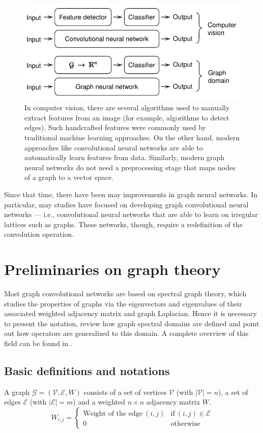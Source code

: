     \begin{figure}
        \centering
        \includegraphics[width=\textwidth]{images/comparison_nn_gnn.pdf}
        \caption{In computer vision, there are several algorithms used to manually extract features from an image (for example, algorithms to detect edges). Such handcrafted features were commonly used by traditional machine learning approaches. On the other hand, modern approaches like convolutional neural networks are able to automatically learn features from data. Similarly, modern graph neural networks do not need a preprocessing stage that maps nodes of a graph to a vector space.}
        \label{comparison_nn_gnn}
    \end{figure}
    
    Since that time, there have been may improvements in graph neural networks. In particular, may studies have focused on developing graph convolutional neural networks --- i.e., convolutional neural networks that are able to learn on irregular lattices such as graphs. These networks, though, require a redefinition of the convolution operation.
    \section{Preliminaries on graph theory}
        Most graph convolutional networks are based on spectral graph theory, which studies the properties of graphs via the eigenvectors and eigenvalues of their associated weighted adjacency matrix and graph Laplacian. Hence it is necessary to present the notation, review how graph spectral domains are defined and point out how operators are generalized to this domain. A complete overview of this field can be found in \cite{Shuman}.
        \subsection{Basic definitions and notations}
            A graph \(\mathcal{G} = \left(\mathcal{V}, \mathcal{E}, W\right)\) consists of a set of vertices \(\mathcal{V}\) (with \(\left|\mathcal{V}\right| = n\)), a set of edges \(\mathcal{E}\) (with \(\left|\mathcal{E}\right| = m\)) and a weighted \(n \times n\) adjacency matrix \(W\).
            \[W_{i,j} =
            \begin{cases}
                \text{Weight of the edge}\ \left(i,j\right) & \text{if}\ \left(i,j\right) \in \mathcal{E} \\
                0 & \text{otherwise}
            \end{cases}\]
